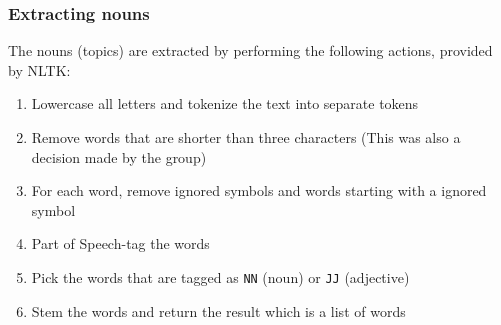 \subsubsection{Extracting nouns}

The nouns (topics) are extracted by performing the following actions, provided
by NLTK:

\begin{enumerate}
    \item Lowercase all letters and tokenize the text into separate tokens
    \item Remove words that are shorter than three characters (This was also a
          decision made by the group)
    \item For each word, remove ignored symbols and words starting with a
	    ignored symbol
    \item Part of Speech-tag \cite{pos} the words
    \item Pick the words that are tagged as \texttt{NN} (noun) or \texttt{JJ}
        (adjective)
    \item Stem the words and return the result which is a list of words
\end{enumerate}






